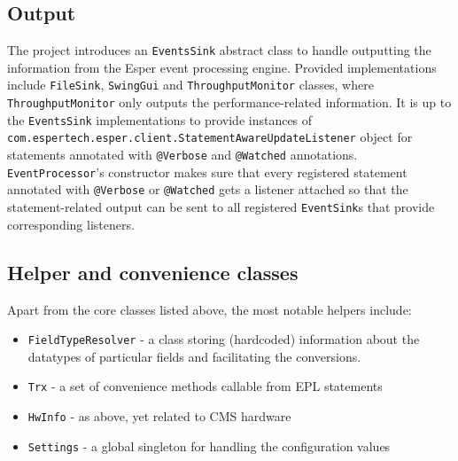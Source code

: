 \subsection{Output}

The project introduces an \texttt{EventsSink} abstract class to handle outputting the information from the Esper event processing engine. Provided implementations include \texttt{FileSink}, \texttt{SwingGui} and \texttt{ThroughputMonitor} classes, where \texttt{ThroughputMonitor} only outputs the performance-related information. It is up to the \texttt{EventsSink} implementations to provide instances of \texttt{com.espertech.esper.client.StatementAwareUpdateListener} object for statements annotated with \texttt{@Verbose} and \texttt{@Watched} annotations. 
\texttt{EventProcessor}'s constructor makes sure that every registered statement annotated with \texttt{@Verbose} or \texttt{@Watched} gets a listener attached so that the statement-related output can be sent to all registered \texttt{EventSink}s that provide corresponding listeners.


\subsection{Helper and convenience classes}

Apart from the core classes listed above, the most notable helpers include:

\begin{itemize}
	\item \texttt{FieldTypeResolver} - a class storing (hardcoded) information about the datatypes of particular fields and facilitating the conversions.
	\item \texttt{Trx} - a set of convenience methods callable from EPL statements
	\item \texttt{HwInfo} - as above, yet related to CMS hardware
	\item \texttt{Settings} - a global singleton for handling the configuration values
\end{itemize}